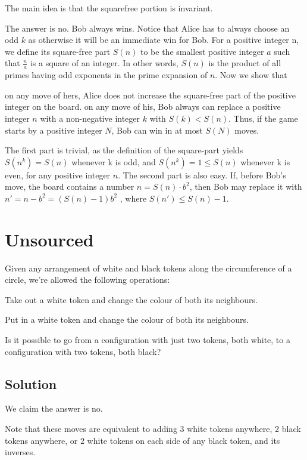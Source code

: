 \documentclass[mast]{lucky}
\begin{document}
The main idea is that the squarefree portion is invariant.

The answer is no. Bob always wins. Notice that Alice has to always choose an odd $k$ as otherwise it will be an immediate win for Bob. For a positive integer n, we define its square-free part
$S(n)$ to be the smallest positive integer $a$ such that $\frac{n}{a}$ is a square of an integer. In other words,
$S(n)$ is the product of all primes having odd exponents in the prime expansion of $n$.
Now we show that \begin{itemize}
    \Item on any move of hers, Alice does not increase the square-free part of the positive integer on the board.
    \Item on any move of his, Bob always can replace a positive integer $n$ with a non-negative integer $k$ with $S(k) < S(n)$. Thus, if the game starts by a positive integer $N$, Bob can win in at most $S(N)$ moves.
\end{itemize}  
The first part is trivial, as the definition of the square-part yields $S(n^k) = S(n)$ whenever k is odd, and $S(n^k) = 1 \leq S(n)$ whenever k is even, for any positive integer $n$.
The second part is also easy. If, before Bob’s move, the board contains a number $n = S(n)\cdot b^2$, then Bob may replace it with $n' = n - b^2 = (S(n) - 1)b^2$ , where $S(n') \leq S(n) - 1.$ 
 
\pagebreak\section{Unsourced}

Given any arrangement of white and black tokens along the circumference of a circle, we're allowed the following operations:
    \begin{itemize}
        \Item Take out a white token and change the colour of both its neighbours.
        
        \Item Put in a white token and change the colour of both its neighbours.
    \end{itemize}
    Is it possible to go from a configuration with just two tokens, both white, to a configuration with two tokens, both black?

\subsection{Solution}

We claim the answer is no.

Note that these moves are equivalent to adding $3$ white tokens anywhere, $2$ black tokens anywhere, or $2$ white tokens on each side of any black token, and its inverses.
\end{document}
